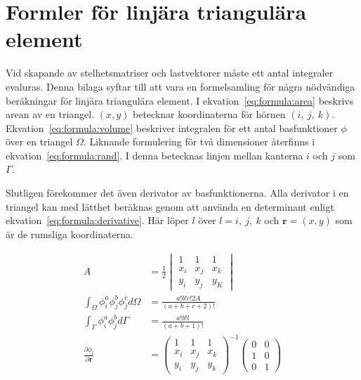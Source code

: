 \chapter{Formler för linjära triangulära element}
\label{sec:integrationformulae}


Vid skapande av stelhetsmatriser och lastvektorer måste ett antal integraler
evaluras. Denna bilaga syftar till att vara en formelsamling för några
nödvändiga beräkningar för linjära triangulära element. I ekvation~\eqref{eq:formula:area} beskrivs arean av en triangel. $(x,y)$ betecknar koordinaterna
för hörnen $(i,~j,~k)$. Ekvation~\eqref{eq:formula:volume} beskriver integralen för ett
antal basfunktioner $\phi$ över en triangel $\Omega$. Liknande formulering för två dimensioner
återfinns i ekvation~\eqref{eq:formula:rand}. I denna betecknas linjen mellan kanterna
$i$ och $j$ som $\Gamma$.\cite{lewis04}

Slutligen förekommer det även derivator av basfunktionerna. Alla derivator i en triangel
kan med lätthet beräknas genom att använda en determinant enligt ekvation~\eqref{eq:formula:derivative}. Här löper $l$ över $l=i,~j,~k$ och $\mathbf{r} = (x,y)$ som är
de rumsliga koordinaterna.\cite{fem50}

\begin{align}
\label{eq:formula:area}
A &=
\frac{1}{2}
\begin{vmatrix}
1 & 1 & 1 \\
x_i & x_j & x_k \\
y_i & y_j & y_K
\end{vmatrix} \\
\label{eq:formula:volume}
\int_\Omega \phi^a_i\phi^b_j\phi^c_j d\Omega &=
\frac{a!b!c!2A}{(a+b+c+2)!} \\
\label{eq:formula:rand}
\int_\Gamma \phi^a_i \phi^b_j d\Gamma &=
\frac{a!b!l}{(a+b+1)!} \\
\label{eq:formula:derivative}
\frac{\partial \phi_l}{\partial \mathbf{r} } &=
\begin{pmatrix}
1 & 1 & 1 \\
x_i & x_j & x_k \\
y_i & y_j & y_k  
\end{pmatrix}^{-1}
\begin{pmatrix}
0 & 0 \\
1 & 0 \\
0 & 1
\end{pmatrix}
\end{align}

